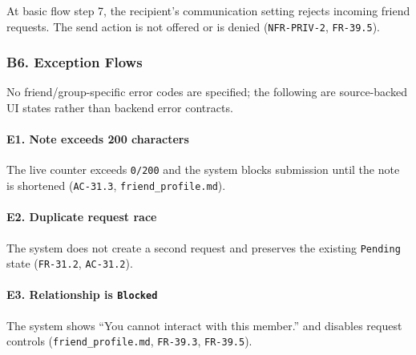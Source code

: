 \documentclass[12pt]{article}
\begin{document}
At basic flow step 7, the recipient's communication setting rejects incoming friend requests. The send action is not offered or is denied (\texttt{NFR-PRIV-2}, \texttt{FR-39.5}).
\par\medskip

\hypertarget{sec:b6-exception-flows}{}
\subsubsection*{B6. Exception Flows}
\par\medskip

No friend/group-specific error codes are specified; the following are source-backed UI states rather than backend error contracts.
\par\medskip

\hypertarget{sec:e1-note-exceeds-200-characters}{}
\paragraph*{E1. Note exceeds 200 characters}
\par\medskip

The live counter exceeds \texttt{0/200} and the system blocks submission until the note is shortened (\texttt{AC-31.3}, \texttt{friend\_profile.md}).
\par\medskip

\hypertarget{sec:e2-duplicate-request-race}{}
\paragraph*{E2. Duplicate request race}
\par\medskip

The system does not create a second request and preserves the existing \texttt{Pending} state (\texttt{FR-31.2}, \texttt{AC-31.2}).
\par\medskip

\hypertarget{sec:e3-relationship-is-blocked}{}
\paragraph*{E3. Relationship is \texttt{Blocked}}
\par\medskip

The system shows “You cannot interact with this member.” and disables request controls (\texttt{friend\_profile.md}, \texttt{FR-39.3}, \texttt{FR-39.5}).
\par\medskip
\end{document}
